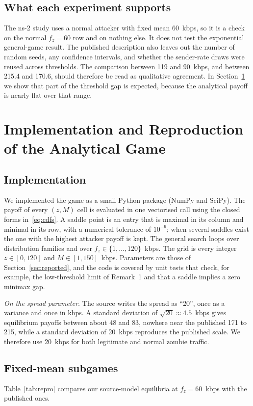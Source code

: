 \documentclass[conference]{IEEEtran}
\begin{document}
\subsection{What each experiment supports}
The ns-2 study uses a normal attacker with fixed mean 60~kbps, so it is a check on the normal $f_z{=}60$ row and on nothing else. It does not test the exponential general-game result. The published description also leaves out the number of random seeds, any confidence intervals, and whether the sender-rate draws were reused across thresholds. The comparison between 119 and 90~kbps, and between 215.4 and 170.6, should therefore be read as qualitative agreement. In Section~\ref{sec:repro} we show that part of the threshold gap is expected, because the analytical payoff is nearly flat over that range.

\section{Implementation and Reproduction of the Analytical Game}\label{sec:repro}

\subsection{Implementation}
We implemented the game as a small Python package (NumPy and SciPy). The payoff of every $(z,M)$ cell is evaluated in one vectorised call using the closed forms in~\eqref{eq:cdfs}. A saddle point is an entry that is maximal in its column and minimal in its row, with a numerical tolerance of $10^{-9}$; when several saddles exist the one with the highest attacker payoff is kept. The general search loops over distribution families and over $f_z\in\{1,\dots,120\}$~kbps. The grid is every integer $z\in[0,120]$ and $M\in[1,150]$~kbps. Parameters are those of Section~\ref{sec:reported}, and the code is covered by unit tests that check, for example, the low-threshold limit of Remark~1 and that a saddle implies a zero minimax gap.

\emph{On the spread parameter.} The source writes the spread as ``20'', once as a variance and once in kbps. A standard deviation of $\sqrt{20}\approx4.5$~kbps gives equilibrium payoffs between about 48 and 83, nowhere near the published 171 to 215, while a standard deviation of 20~kbps reproduces the published scale. We therefore use 20~kbps for both legitimate and normal zombie traffic.

\subsection{Fixed-mean subgames}
Table~\ref{tab:repro} compares our source-model equilibria at $f_z{=}60$~kbps with the published ones.
\end{document}
